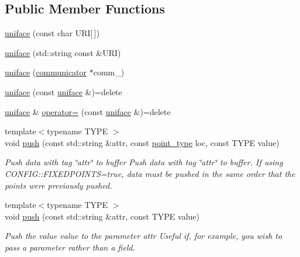 \subsection*{Public Member Functions}
\begin{DoxyCompactItemize}
\item 
\hyperlink{classmui_1_1uniface_ae8b84ab8a58db4e2f1c8680499167c6d}{uniface} (const char U\+RI\mbox{[}$\,$\mbox{]})
\item 
\hyperlink{classmui_1_1uniface_a5c2dd9f396dd2f222b5caf6dd5adb522}{uniface} (std\+::string const \&U\+RI)
\item 
\hyperlink{classmui_1_1uniface_a6a26805f1cdeec551194331dbf65c0ad}{uniface} (\hyperlink{classmui_1_1communicator}{communicator} $\ast$comm\+\_\+)
\item 
\hyperlink{classmui_1_1uniface_a83a87ba6918e8c36866057975ed7a097}{uniface} (const \hyperlink{classmui_1_1uniface}{uniface} \&)=delete
\item 
\hyperlink{classmui_1_1uniface}{uniface} \& \hyperlink{classmui_1_1uniface_a9452cc41125184ca4088d7c1b3b93ad1}{operator=} (const \hyperlink{classmui_1_1uniface}{uniface} \&)=delete
\item 
{\footnotesize template$<$typename T\+Y\+PE $>$ }\\void \hyperlink{classmui_1_1uniface_a054a9fe331fe008bb5910493d6a1bec3}{push} (const std\+::string \&attr, const \hyperlink{classmui_1_1uniface_abc356ab801269c69e38dc07179f85ef9}{point\+\_\+type} loc, const T\+Y\+PE value)
\begin{DoxyCompactList}\small\item\em Push data with tag \char`\"{}attr\char`\"{} to buffer Push data with tag \char`\"{}attr\char`\"{} to buffer. If using C\+O\+N\+F\+I\+G\+::\+F\+I\+X\+E\+D\+P\+O\+I\+N\+TS=true, data must be pushed in the same order that the points were previously pushed. \end{DoxyCompactList}\item 
{\footnotesize template$<$typename T\+Y\+PE $>$ }\\void \hyperlink{classmui_1_1uniface_ade5db3c4a7fb4524c468e442a56092d7}{push} (const std\+::string \&attr, const T\+Y\+PE value)
\begin{DoxyCompactList}\small\item\em Push the value {\ttfamily value} to the parameter {\ttfamily attr} Useful if, for example, you wish to pass a parameter rather than a field. \end{DoxyCompactList}\item 

\end{DoxyCompactItemize}
